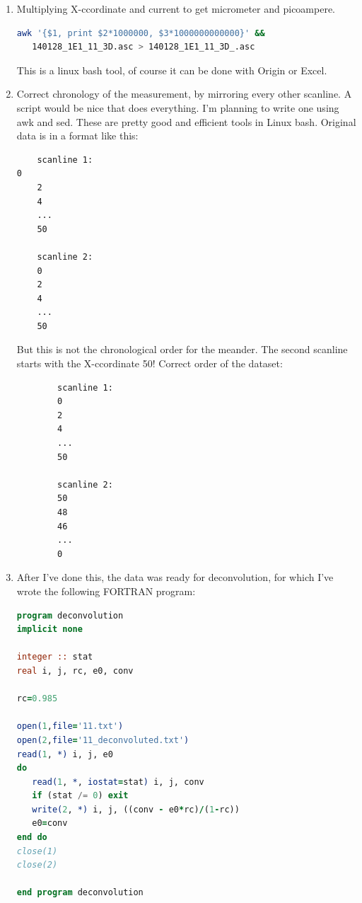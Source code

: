 \documentclass[a4paper, 11pt]{article}
\begin{document}
\begin{enumerate}
\item Multiplying X-ccordinate and current to get micrometer and picoampere.
   
\begin{lstlisting}[language=bash]
   awk '{$1, print $2*1000000, $3*1000000000000}' &&
   140128_1E1_11_3D.asc > 140128_1E1_11_3D_.asc
\end{lstlisting}

   This is a linux bash tool, of course it can be done with Origin or Excel.

\item Correct chronology of the measurement, by mirroring every other scanline. A script would be nice that does everything. I'm planning to write one using awk and sed. These are pretty good and efficient tools in Linux bash. Original data is in a format like this:

\begin{verbatim}
	scanline 1:
0
	2
	4
	...
	50

	scanline 2:
	0
	2
	4
	...
	50
\end{verbatim}

   But this is not the chronological order for the meander. The second scanline starts with the X-ccordinate 50! Correct order of the dataset:

\begin{verbatim}
        scanline 1:
        0
        2
        4
        ...
        50

        scanline 2:
        50
        48
        46
        ...
        0
\end{verbatim}

\item After I've done this, the data was ready for deconvolution, for which I've wrote the following FORTRAN program:

\begin{lstlisting}[language=fortran]
program deconvolution
implicit none

integer :: stat
real i, j, rc, e0, conv

rc=0.985

open(1,file='11.txt')
open(2,file='11_deconvoluted.txt')
read(1, *) i, j, e0
do
   read(1, *, iostat=stat) i, j, conv
   if (stat /= 0) exit
   write(2, *) i, j, ((conv - e0*rc)/(1-rc))
   e0=conv
end do
close(1) 
close(2)

end program deconvolution
\end{lstlisting}


\end{enumerate}
\end{document}
